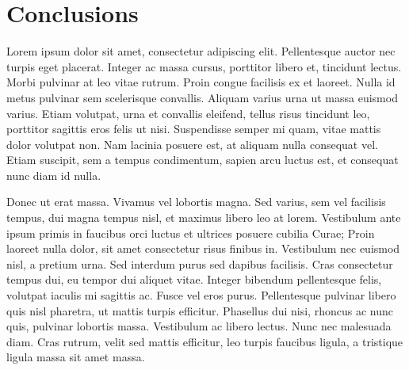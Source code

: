\section{Conclusions} \label{conclusions}

Lorem ipsum dolor sit amet, consectetur adipiscing elit. Pellentesque auctor nec turpis eget placerat. Integer ac massa cursus, porttitor libero et, tincidunt lectus. Morbi pulvinar at leo vitae rutrum. Proin congue facilisis ex et laoreet. Nulla id metus pulvinar sem scelerisque convallis. Aliquam varius urna ut massa euismod varius. Etiam volutpat, urna et convallis eleifend, tellus risus tincidunt leo, porttitor sagittis eros felis ut nisi. Suspendisse semper mi quam, vitae mattis dolor volutpat non. Nam lacinia posuere est, at aliquam nulla consequat vel. Etiam suscipit, sem a tempus condimentum, sapien arcu luctus est, et consequat nunc diam id nulla.

Donec ut erat massa. Vivamus vel lobortis magna. Sed varius, sem vel facilisis tempus, dui magna tempus nisl, et maximus libero leo at lorem. Vestibulum ante ipsum primis in faucibus orci luctus et ultrices posuere cubilia Curae; Proin laoreet nulla dolor, sit amet consectetur risus finibus in. Vestibulum nec euismod nisl, a pretium urna. Sed interdum purus sed dapibus facilisis. Cras consectetur tempus dui, eu tempor dui aliquet vitae. Integer bibendum pellentesque felis, volutpat iaculis mi sagittis ac. Fusce vel eros purus. Pellentesque pulvinar libero quis nisl pharetra, ut mattis turpis efficitur. Phasellus dui nisi, rhoncus ac nunc quis, pulvinar lobortis massa. Vestibulum ac libero lectus. Nunc nec malesuada diam. Cras rutrum, velit sed mattis efficitur, leo turpis faucibus ligula, a tristique ligula massa sit amet massa.

